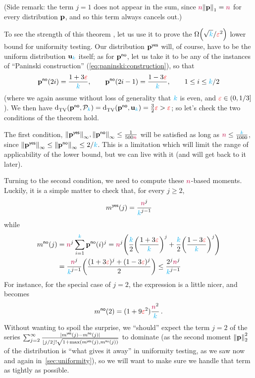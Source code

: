 \noindent (Side remark: the term $j=1$ does not appear in the sum, since $\ns\norm{\p}_1=\ns$ for every distribution $\mathbf{p}$, and so this term always cancels out.)\medskip

To see the strength of this theorem , let us use it to prove the $\bigOmega{\sqrt{\ab}/\dst^2}$ lower bound for uniformity testing. Our distribution $\mathbf{p}^{\sf{}yes}$ will, of course, have to be the uniform distribution $\mathbf{u}_{\textcolor{cyan}{k}}$ itself; as for $\mathbf{p}^{{\sf{}no}}$, let us take it to be any of the instances of ``Paninski construction'' (\cref{eq:paninski:construction}), so that
\[
	\mathbf{p}^{{\sf{}no}}(2i) = \frac{1+3\textcolor{red}{\varepsilon}}{{\textcolor{cyan}{k}}}, \qquad \mathbf{p}^{{\sf{}no}}(2i-1) = \frac{1-3\textcolor{red}{\varepsilon}}{{\textcolor{cyan}{k}}}, \qquad 1\leq i\leq {\textcolor{cyan}{k}}/2
\]
(where we again assume without loss of generality that ${\textcolor{cyan}{k}}$ is even, and $\textcolor{red}{\varepsilon}\in(0,1/3]$). We then have 
$\totalvardist{\p^\no}{\property_\ab}=\totalvardist{\p^\no}{\uniform_\ab}= \frac{3}{2}\dst > \dst$; so let's check the two conditions of the theorem hold. 

The first condition, 
$\norminf{\p^\yes},\norminf{\p^\no} \leq \frac{1}{500\ns}$
will be satisfied as long as ${\textcolor{purple}{n}} \leq \frac{{\textcolor{cyan}{k}}}{1000}$, since $\norminf{\p^\yes}\leq \norminf{\p^\no} \leq 2/\ab$. This is a limitation which will limit the range of applicability of the lower bound, but we can live with it (and will get back to it later).

Turning to the second condition, we need to compute these ${\textcolor{purple}{n}}$-based moments. Luckily, it is a simple matter to check that, for every $j\geq 2$,
\begin{equation}
	\label{eq:moments:yes}
	m^{{\sf{}yes}}(j) = \frac{{\textcolor{purple}{n}}^j}{{\textcolor{cyan}{k}}^{j-1}}
\end{equation}
while
\begin{align}
	m^{\no}(j) 
	&= \ns^j \sum_{i=1}^\ab \p^{\no}(i)^j 
	= \ns^j\Paren{ \frac{\ab}{2} \Paren{\frac{1+3\dst}{\ab}}^j + \frac{\ab}{2} \Paren{\frac{1-3\dst}{\ab}}^j } \notag\\
	&= \frac{\ns^j}{\ab^{j-1}}\Paren{ \frac{(1+3\dst)^j + (1-3\dst)^j}{2} }
	\leq \frac{2^j\ns^j}{\ab^{j-1}} \label{eq:moments:no}
\end{align}
For instance, for the special case of $j=2$, the expression is a little nicer, and becomes
\begin{equation}
	m^{{\sf{}no}}(2)
	= (1+9\textcolor{red}{\varepsilon}^2)\frac{{\textcolor{purple}{n}}^2}{{\textcolor{cyan}{k}}}\,.
\end{equation}
Without wanting to spoil the surprise, we ``should'' expect the term $j=2$ of the series $\sum_{j=2}^\infty \frac{\abs{m^{\yes}(j)-m^{\no}(j)}}{\flr{j/2}!\sqrt{1+\max(m^{\yes}(j),m^{\no}(j))}}$ to dominate (as the second moment $\normtwo{\p}^2$ of the distribution is ``what gives it away'' in uniformity testing, as we saw now and again in~\cref{sec:uniformity}), so we will want to make sure we handle that term as tightly as possible.\medskip

